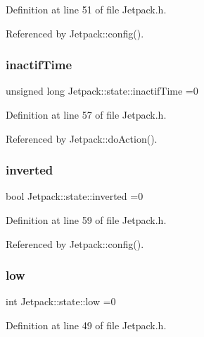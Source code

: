 Definition at line 51 of file Jetpack.\+h.



Referenced by Jetpack\+::config().

\mbox{\label{structJetpack_1_1state_aaf817b1f9e7a4d65b9e3ca4726b281f6}} 
\subsubsection{\texorpdfstring{inactif\+Time}{inactifTime}}
{\footnotesize\ttfamily unsigned long Jetpack\+::state\+::inactif\+Time =0}



Definition at line 57 of file Jetpack.\+h.



Referenced by Jetpack\+::do\+Action().

\mbox{\label{structJetpack_1_1state_a6bc03bb8f05b10aa142dbb0c39c87fb5}} 
\subsubsection{\texorpdfstring{inverted}{inverted}}
{\footnotesize\ttfamily bool Jetpack\+::state\+::inverted =0}



Definition at line 59 of file Jetpack.\+h.



Referenced by Jetpack\+::config().

\mbox{\label{structJetpack_1_1state_ace3ecd2b1f262756d8f7a8adda20136a}} 
\subsubsection{\texorpdfstring{low}{low}}
{\footnotesize\ttfamily int Jetpack\+::state\+::low =0}



Definition at line 49 of file Jetpack.\+h.



